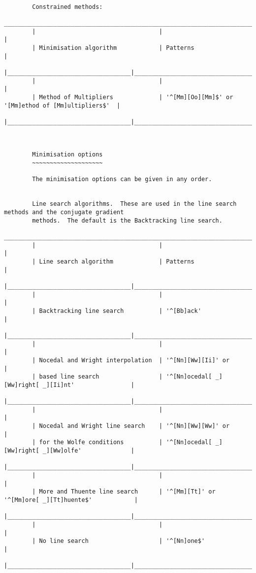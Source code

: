 \begin{verbatim}
    
        Constrained methods:
        ___________________________________________________________________________________________
        |                                   |                                                     |
        | Minimisation algorithm            | Patterns                                            |
        |___________________________________|_____________________________________________________|
        |                                   |                                                     |
        | Method of Multipliers             | '^[Mm][Oo][Mm]$' or '[Mm]ethod of [Mm]ultipliers$'  |
        |___________________________________|_____________________________________________________|
    
    
    
        Minimisation options
        ~~~~~~~~~~~~~~~~~~~~
    
        The minimisation options can be given in any order.
    
    
        Line search algorithms.  These are used in the line search methods and the conjugate gradient
        methods.  The default is the Backtracking line search.
        ___________________________________________________________________________________________
        |                                   |                                                     |
        | Line search algorithm             | Patterns                                            |
        |___________________________________|_____________________________________________________|
        |                                   |                                                     |
        | Backtracking line search          | '^[Bb]ack'                                          |
        |___________________________________|_____________________________________________________|
        |                                   |                                                     |
        | Nocedal and Wright interpolation  | '^[Nn][Ww][Ii]' or                                  |
        | based line search                 | '^[Nn]ocedal[ _][Ww]right[ _][Ii]nt'                |
        |___________________________________|_____________________________________________________|
        |                                   |                                                     |
        | Nocedal and Wright line search    | '^[Nn][Ww][Ww]' or                                  |
        | for the Wolfe conditions          | '^[Nn]ocedal[ _][Ww]right[ _][Ww]olfe'              |
        |___________________________________|_____________________________________________________|
        |                                   |                                                     |
        | More and Thuente line search      | '^[Mm][Tt]' or '^[Mm]ore[ _][Tt]huente$'            |
        |___________________________________|_____________________________________________________|
        |                                   |                                                     |
        | No line search                    | '^[Nn]one$'                                         |
        |___________________________________|_____________________________________________________|
    

\end{verbatim}
